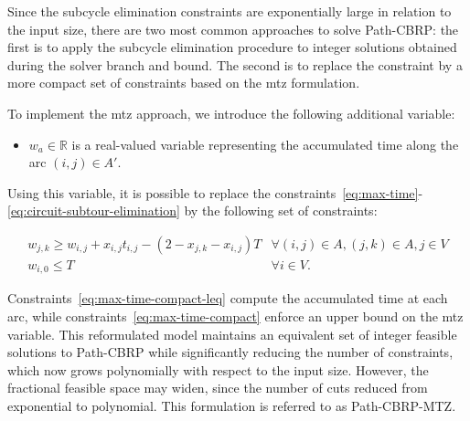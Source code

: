 Since the subcycle elimination constraints are exponentially large in relation
to the input size, there are two most common approaches to solve Path-CBRP:
the first is to apply the subcycle elimination procedure to integer solutions
obtained during the solver branch and bound. The second is to replace the
constraint by a more compact set of constraints based on the \gls{mtz}
formulation.


To implement the \gls{mtz} approach, we introduce the following additional
variable: 

\begin{itemize}
	\item $w_{a} \in \mathbb{R}$ is a real-valued variable representing the accumulated
	      time along the arc $(i, j) \in A'$.
\end{itemize}

Using this variable, it is possible to replace the constraints~\eqref{eq:max-time}-\eqref{eq:circuit-subtour-elimination}
by the following set of constraints:

\begin{align}
	 & w_{j,k} \geq w_{i,j} + x_{i,j}t_{i,j} - (2 - x_{j,k} - x_{i,j})T & \forall (i, j) \in A, (j, k) \in A, j \in V \label{eq:max-time-compact-leq}                               \\
	 & w_{i,0} \leq T                                                   & \forall i \in V.                                                            & \label{eq:max-time-compact}
\end{align}

Constraints~\eqref{eq:max-time-compact-leq} compute the accumulated time at each
arc, while constraints~\eqref{eq:max-time-compact} enforce an upper bound on the
\gls{mtz} variable. This reformulated model maintains an equivalent set of integer
feasible solutions to Path-CBRP while significantly reducing the number of
constraints, which now grows polynomially with respect to the input size.
However, the fractional feasible space may widen, since the number of cuts
reduced from exponential to polynomial. This formulation is referred to as
Path-CBRP-MTZ.

